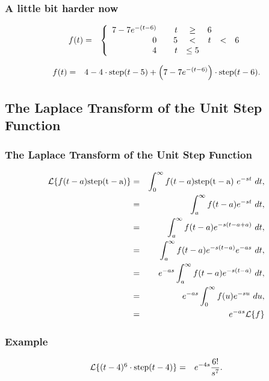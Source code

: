 \begin{frame}
  \frametitle{A little bit harder now}

  \begin{eqnarray*}
      f(t) & = & 
      \left\{
        \begin{array}{r@{\hspace{2em}}rcccl}
          7-7e^{-(t-6)} & t & \geq & 6 \\
          0 & 5 & < & t & < & 6 \\
          4 & t & \leq 5 
        \end{array}
      \right.
  \end{eqnarray*}

  {
    \begin{eqnarray*}
      f(t) & = & 4 - 4\cdot\mathrm{step}(t-5) + \left( 7-7e^{-(t-6)}\right)\cdot\mathrm{step}(t-6).
    \end{eqnarray*}
  }


\end{frame}


\subsection{The Laplace Transform of the Unit Step Function}

\begin{frame}
  \frametitle{The Laplace Transform of the Unit Step Function}

  \begin{eqnarray*}
    \laplace{f(t-a)\mathrm{step(t-a)}} & = & 
           \int^\infty_0 f(t-a)\mathrm{step(t-a)} ~ e^{-st} ~ dt, \\
    & = &  \int^\infty_a f(t-a) e^{-st} ~ dt, \\
    & = & \int^\infty_a f(t-a) e^{-s(t-a+a)} ~ dt, \\
    & = & \int^\infty_a f(t-a) e^{-s(t-a)}e^{-as} ~ dt, \\
    & = & e^{-as} \int^\infty_a f(t-a) e^{-s(t-a)} ~ dt, \\
    & = & e^{-as} \int^\infty_0 f(u) e^{-su} ~ du, \\
    & = & e^{-as} \laplace{f} \\
  \end{eqnarray*}

\end{frame}


\begin{frame}
  \frametitle{Example}

  \begin{eqnarray*}
    \laplace{(t-4)^6\cdot\mathrm{step}(t-4)} & = & e^{-4s}\frac{6!}{s^7}.
  \end{eqnarray*}


\end{frame}


